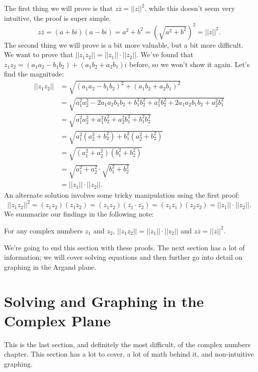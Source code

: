 \documentclass[../book.tex]{subfiles}
\begin{document}
The first thing we will prove is that $z\overline{z}=||z||^2$.  while this doesn't seem very intuitive, the proof is super simple.  $$z\overline{z}=\left(a+bi\right)\left(a-bi\right)=a^2+b^2=\left(\sqrt{a^2+b^2}\right)^2=||z||^2.$$
The second thing we will prove is a bit more valuable, but a bit more difficult.  We want to prove that $||z_1z_2||=||z_1|| \cdot ||z_2||$.  We've found that $z_1z_2=\left(a_1a_2-b_1b_2\right)+\left(a_1b_2+a_2b_1\right)i$ before, so we won't show it again.  Let's find the magnitude: \begin{align*}
    ||z_1z_2||&=\sqrt{\left(a_1a_2-b_1b_2\right)^2+\left(a_1b_2+a_2b_1\right)^2} \\
    &= \sqrt{a_1^2a_2^2-2a_1a_2b_1b_2+b_1^2b_2^2+a_1^2b_2^2+2a_1a_2b_1b_2+a_2^2b_1^2} \\
    &= \sqrt{a_1^2a_2^2+a_1^2b_2^2+a_2^2b_1^2+b_1^2b_2^2} \\ 
    &= \sqrt{a_1^2\left(a_2^2+b_2^2\right)+b_1^2\left(a_2^2+b_2^2\right)} \\
    &= \sqrt{\left(a_1^2+a_2^2\right)\left(b_1^2+b_2^2\right)} \\
    &= \sqrt{a_1^2+a_2^2}\cdot \sqrt{b_1^2+b_2^2} \\
    &=||z_1|| \cdot ||z_2||.
\end{align*}
An alternate solution involves some tricky manipulation using the first proof: $$||z_1z_2||^2=\left(z_1z_2\right)\left(\overline{z_1z_2}\right)=\left(z_1z_2\right)\left(\overline{z_1}\cdot \overline{z_2}\right)=\left(z_1\overline{z_1}\right)\left(z_2\overline{z_2}\right)=||z_1||\cdot ||z_2||.$$
We summarize our findings in the following note: \begin{note}
For any complex numbers $z_1$ and $z_2$, $||z_1z_2||=||z_1||\cdot ||z_2||$ and $z\overline{z}=||z||^2$.
\end{note}
\noindent We're going to end this section with these proofs.  The next section has a lot of information; we will cover solving equations and then further go into detail on graphing in the Argand plane.

\section{Solving and Graphing in the Complex Plane}
\noindent This is the last section, and definitely the most difficult, of the complex numbers chapter.  This section has a lot to cover, a lot of math behind it, and non-intuitive graphing.  
\end{document}
